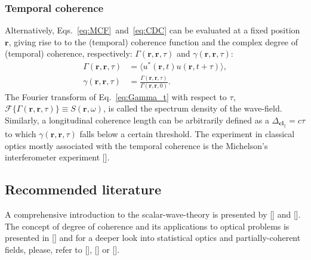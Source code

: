 \begin{refsection}
\subsubsection*{Temporal coherence}

Alternatively, Eqs.~\ref{eq:MCF}~and~\ref{eq:CDC} can be evaluated at a fixed position $\textbf{r}$, giving rise to to the (temporal) coherence function and the complex degree of (temporal) coherence, respectively: $\Gamma(\textbf{r},\textbf{r},\tau)$ and $\gamma(\textbf{r},\textbf{r},\tau)$:
\begin{align}
    \Gamma(\textbf{r},\textbf{r},\tau)&=\big\langle u^*(\textbf{r},t)u(\textbf{r},t+\tau)\big\rangle,\label{eq:Gamma_t}\\
    \gamma(\textbf{r},\textbf{r},\tau) &= \frac{\Gamma(\textbf{r},\textbf{r},\tau)}{\Gamma(\textbf{r},\textbf{r},0)}.\label{eq:gamma_t}
\end{align}{}
The Fourier transform of Eq.~\ref{eq:Gamma_t} with respect to $\tau$, $\mathcal{F}\big\{\Gamma(\textbf{r},\textbf{r},\tau)\big\}\equiv S(\textbf{r},\omega)$, is called the spectrum density of the wave-field. Similarly, a longitudinal coherence length can be arbitrarily defined as a $\Delta_{\textbf{cl}_\parallel}=c\tau$ to which $\gamma(\textbf{r},\textbf{r},\tau)$ falls below a certain threshold.
The experiment in classical optics mostly associated with the temporal coherence is the Michelson's interferometer experiment [\cite[\textit{§5.1.1}]{Goodman2015}].

\subsection*{Recommended literature}

A comprehensive introduction to the scalar-wave-theory is presented by [\cite[\textit{§1} \& \textit{§2}]{Paganin2006}] and [\cite{Goodman2017}]. The concept of degree of coherence and its applications to optical problems is presented in [\cite{Zernike1938}] and for a deeper look into statistical optics and partially-coherent fields, please, refer to [\cite[\textit{§4}]{Mandel1995}], [\cite[\textit{§10}]{born_wolf1999}] or [\cite[\textit{§5}]{Goodman2015}].


\end{refsection}

